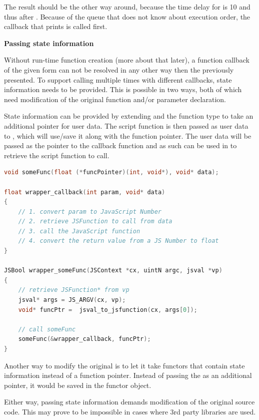 The result should be the other way around, because the time delay for  is 10 and thus after . Because of the queue that does not know about execution order, the callback that prints  is called first.

\textbf{Passing state information}

Without run-time function creation (more about that later), a function callback of the given form can not be resolved in any other way then the previously presented. To support calling  multiple times with different callbacks, state information needs to be provided. This is possible in two ways, both of which need modification of the original function and/or parameter declaration.

State information can be provided by extending  and the function type to take an additional  pointer for user data. The script function is then passed as user data to , which will use/save it along with the function pointer. The user data will be passed as the  pointer to the  callback function and as such can be used in  to retrieve the script function to call.

\SingleSpacing
\begin{lstlisting}[language=C++, caption=Wrapper code for handling methods that take function pointers \#2]
void someFunc(float (*funcPointer)(int, void*), void* data);

float wrapper_callback(int param, void* data)
{
	// 1. convert param to JavaScript Number
	// 2. retrieve JSFunction to call from data
	// 3. call the JavaScript function
	// 4. convert the return value from a JS Number to float
}

JSBool wrapper_someFunc(JSContext *cx, uintN argc, jsval *vp)
{
	// retrieve JSFunction* from vp
	jsval* args = JS_ARGV(cx, vp);
	void* funcPtr =  jsval_to_jsfunction(cx, args[0]);
	
	// call someFunc
	someFunc(&wrapper_callback, funcPtr);
}
\end{lstlisting}
\OnehalfSpacing

Another way to modify the original  is to let it take functors that contain state information instead of a function pointer. Instead of passing the  as an additional  pointer, it would be saved in the functor object.

Either way, passing state information demands modification of the original source code. This may prove to be impossible in cases where 3rd party libraries are used.

